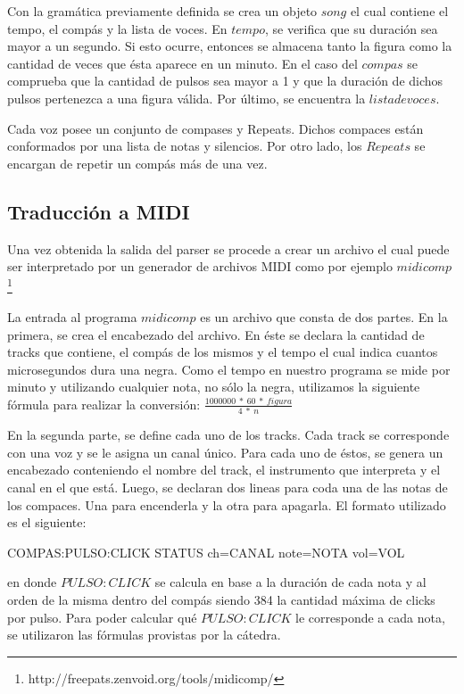 \documentclass[a4paper, 10pt, twoside]{article}
\begin{document}
Con la gramática previamente definida se crea un objeto $song$ el cual contiene el tempo, el compás y la lista de voces. En $tempo$, se verifica que su duración sea mayor a un segundo. Si esto ocurre, entonces se almacena tanto la figura como la cantidad de veces que ésta aparece en un minuto. En el caso del $compas$ se comprueba que la cantidad de pulsos sea mayor a 1 y que la duración de dichos pulsos pertenezca a una figura válida. Por último, se encuentra la $lista de voces$. 

Cada voz posee un conjunto de compases y Repeats. Dichos compaces están conformados por una lista de notas y silencios. Por otro lado, los $Repeats$ se encargan de repetir un compás más de una vez.

\subsection{Traducción a MIDI}
Una vez obtenida la salida del parser se procede a crear un archivo el cual puede ser interpretado por un generador de archivos MIDI como por ejemplo $midicomp$ \footnote{http://freepats.zenvoid.org/tools/midicomp/}

La entrada al programa $midicomp$ es un archivo que consta de dos partes. En la primera, se crea el encabezado del archivo. En éste se declara la cantidad de tracks que contiene, el compás de los mismos y el tempo el cual indica cuantos microsegundos dura una negra. Como el tempo en nuestro programa se mide por minuto y utilizando cualquier nota, no sólo la negra, utilizamos la siguiente fórmula para realizar la conversión:
$\frac{1000000\ *\ 60\ *\ figura}{4\ *\ n}$

En la segunda parte, se define cada uno de los tracks. Cada track se corresponde con una voz y se le asigna un canal único. Para cada uno de éstos, se genera un encabezado conteniendo el nombre del track, el instrumento que interpreta y el canal en el que está. Luego, se declaran dos lineas para coda una de las notas de los compaces. Una para encenderla y la otra para apagarla. El formato utilizado es el siguiente:

\begin{center} 
COMPAS:PULSO:CLICK STATUS ch=CANAL note=NOTA vol=VOL
\end{center}

en donde $PULSO:CLICK$ se calcula en base a la duración de cada nota y al orden de la misma dentro del compás siendo 384 la cantidad máxima de clicks por pulso. Para poder calcular qué $PULSO:CLICK$ le corresponde a cada nota, se utilizaron las fórmulas provistas por la cátedra.
\end{document}

